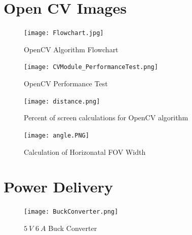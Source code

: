 \documentclass{report}
\begin{document}
    \newpage

    \section{Open CV Images}

    \begin{figure}[ht!]
      \begin{center}
          \texttt{[image: Flowchart.jpg]}\\
          \caption{ OpenCV Algorithm Flowchart  } 
          \label{fig:Flowchart}
      \end{center}
    \end{figure}

    \begin{figure}[ht!]
      \begin{center}
          \texttt{[image: CVModule\_PerformanceTest.png]}\\
          \caption{ OpenCV Performance Test } 
          \label{fig:CVModule_PerformanceTest}
      \end{center}
    \end{figure}

    \begin{figure}[ht!]
      \centering
      \begin{minipage}[b]{0.45\linewidth}
        \centering
        \texttt{[image: distance.png]}
        \caption{Percent of screen calculations for OpenCV algorithm}
        \label{fig:redboxes}
      \end{minipage}
      \hfill
      \begin{minipage}[b]{0.3\linewidth}
        \centering
        \texttt{[image: angle.PNG]}
        \caption{Calculation of Horizonatal FOV Width}
        \label{fig:angle}
      \end{minipage}
    \end{figure}

    \newpage

    \section{Power Delivery}

    \begin{figure}[ht!]
      \begin{center}
          \texttt{[image: BuckConverter.png]}\\
          \caption{ $5~V$ $6~A$ Buck Converter } 
          \label{fig:BuckConverter}
      \end{center}
    \end{figure}
\end{document}
